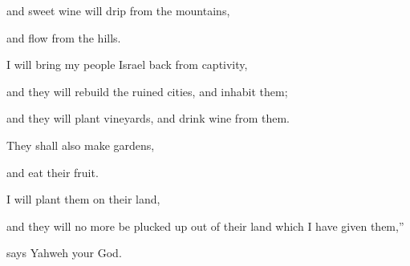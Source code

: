 {\par }{\QB and sweet wine will drip from the mountains,
\par }{\QB and flow from the hills.
\par }{\Q {}I will bring my people Israel back from captivity,
\par }{\QB and they will rebuild the ruined cities, and inhabit them;
\par }{\QB and they will plant vineyards, and drink wine from them.
\par }{\Q They shall also make gardens,
\par }{\QB and eat their fruit.
\par }{\Q {}I will plant them on their land,
\par }{\QB and they will no more be plucked up out of their land which I have given them,”
\par }{\QB says Yahweh your God.
\par }